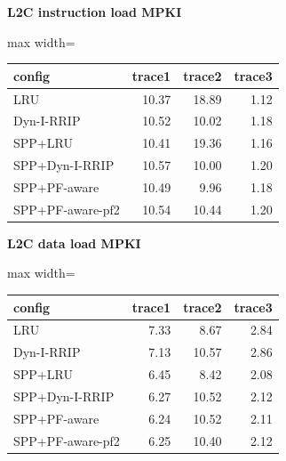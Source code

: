 \documentclass[10pt]{article}
\begin{document}
\begin{center}
\begin{minipage}[t]{0.48\linewidth}\centering
\textbf{L2C instruction load MPKI}\\[3pt]
\begin{adjustbox}{max width=\linewidth}
\begin{tabular}{@{}lrrr@{}}
\toprule
\textbf{config} & \textbf{trace1} & \textbf{trace2} & \textbf{trace3} \\
\midrule
LRU & 10.37 & 18.89 & 1.12 \\
Dyn-I-RRIP & 10.52 & 10.02 & 1.18 \\
SPP+LRU & 10.41 & 19.36 & 1.16 \\
SPP+Dyn-I-RRIP & 10.57 & 10.00 & 1.20 \\
SPP+PF-aware & 10.49 & 9.96 & 1.18 \\
SPP+PF-aware-pf2 & 10.54 & 10.44 & 1.20 \\
\bottomrule
\end{tabular}
\end{adjustbox}
\end{minipage}\hfill
\begin{minipage}[t]{0.48\linewidth}\centering
\textbf{L2C data load MPKI}\\[3pt]
\begin{adjustbox}{max width=\linewidth}
\begin{tabular}{@{}lrrr@{}}
\toprule
\textbf{config} & \textbf{trace1} & \textbf{trace2} & \textbf{trace3} \\
\midrule
LRU & 7.33 & 8.67 & 2.84 \\
Dyn-I-RRIP & 7.13 & 10.57 & 2.86 \\
SPP+LRU & 6.45 & 8.42 & 2.08 \\
SPP+Dyn-I-RRIP & 6.27 & 10.52 & 2.12 \\
SPP+PF-aware & 6.24 & 10.52 & 2.11 \\
SPP+PF-aware-pf2 & 6.25 & 10.40 & 2.12 \\
\bottomrule
\end{tabular}
\end{adjustbox}
\end{minipage}
\end{center}
\end{document}
